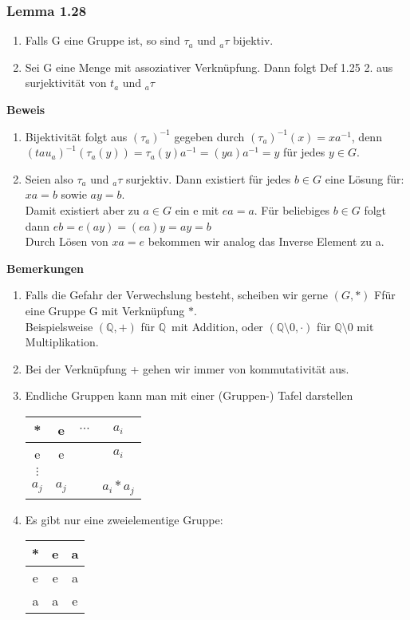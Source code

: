 \documentclass{report}
\newcommand{\Q}{\mathbb{Q}}
\newcommand{\mQ}{$\mathbb{Q}$\ }
\theoremstyle{customrem}
\theoremstyle{customdef}
\begin{document}
\subsubsection{Lemma 1.28}
\begin{enumerate}
\item{Falls G eine Gruppe ist, so sind $\tau_a$ und $_{a}\tau$ bijektiv.}
\item{Sei G eine Menge mit assoziativer Verknüpfung. Dann folgt Def 1.25 2. aus surjektivität von $t_a$ und $_{a}\tau$}
\end{enumerate}
\textbf{Beweis}\\
\begin{enumerate}
\item{
Bijektivität folgt aus  $(\tau_a)^{-1}$ gegeben durch $(\tau_a)^{-1}(x) = x a^{-1}$, denn $(tau_a)^{-1}(\tau_a(y)) = \tau_a(y)a^{-1} = (y a) a^{-1} = y$ für jedes $y \in G$.
}
\item{
 Seien also $\tau_a$ und $_{a}\tau$ surjektiv. Dann existiert für jedes $b \in G$ eine Lösung für:\\
 $x a = b$ sowie $a y = b$.\\
 Damit existiert aber zu $a \in G$ ein  e mit $ea = a$. Für beliebiges $b \in G$ folgt dann $e b = e (a y) = (e a) y = ay = b$\\
 Durch Lösen von $x a = e$ bekommen wir analog das Inverse Element zu a.
}
\end{enumerate}
\textbf{Bemerkungen}
\begin{enumerate}
\item{Falls die Gefahr der Verwechslung besteht, scheiben wir gerne $(G, *)$ Ffür eine Gruppe G mit Verknüpfung $*$.\\
Beispielsweise $(\Q, +)$ für \mQ mit Addition, oder $(\Q \setminus {0}, \cdot)$ für $\Q \setminus {0}$ mit Multiplikation.\\}
\item{Bei der Verknüpfung + gehen wir immer von kommutativität aus.}
\item{Endliche Gruppen kann man mit einer (Gruppen-) Tafel darstellen\\
\begin{tabular}{c || c | c | c}
* & e & $\cdots$ & $a_i$\\
\hline
\hline
e & e &        & $a_i$\\
\hline
$\vdots$ & & \\
\hline
$a_j$ & $a_j$& & $a_i * a_j$
\end{tabular}
}
\item{
Es gibt nur eine zweielementige Gruppe:\\
\begin{tabular}{c || c | c}
* & e & a\\
\hline
\hline
e & e & a\\
\hline
a & a & e
\end{tabular}
}
\end{enumerate}
\end{document}
